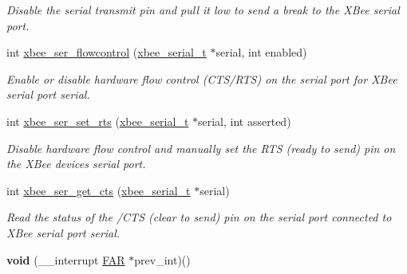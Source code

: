 \begin{DoxyCompactItemize}
\begin{DoxyCompactList}\small\item\em Disable the serial transmit pin and pull it low to send a break to the X\+Bee serial port. \end{DoxyCompactList}\item 
int \hyperlink{group__hal__dos_ga1f5f72ffdfbfb45ac523640db32296ff}{xbee\+\_\+ser\+\_\+flowcontrol} (\hyperlink{structxbee__serial__t}{xbee\+\_\+serial\+\_\+t} $\ast$serial, int enabled)
\begin{DoxyCompactList}\small\item\em Enable or disable hardware flow control (C\+T\+S/\+R\+TS) on the serial port for X\+Bee serial port {\itshape serial}. \end{DoxyCompactList}\item 
int \hyperlink{group__hal__dos_ga731188d8cf41d3d749bc84d51b672535}{xbee\+\_\+ser\+\_\+set\+\_\+rts} (\hyperlink{structxbee__serial__t}{xbee\+\_\+serial\+\_\+t} $\ast$serial, int asserted)
\begin{DoxyCompactList}\small\item\em Disable hardware flow control and manually set the R\+TS (ready to send) pin on the X\+Bee device\textquotesingle{}s serial port. \end{DoxyCompactList}\item 
int \hyperlink{group__hal__dos_ga894f6fadc890b5ba5ce32338f0acd217}{xbee\+\_\+ser\+\_\+get\+\_\+cts} (\hyperlink{structxbee__serial__t}{xbee\+\_\+serial\+\_\+t} $\ast$serial)
\begin{DoxyCompactList}\small\item\em Read the status of the /\+C\+TS (clear to send) pin on the serial port connected to X\+Bee serial port {\itshape serial}. \end{DoxyCompactList}\item 
\mbox{\label{group__hal__dos_ga475b2e273ce4aad9558201d41b6f4459}} 
{\bfseries void} (\+\_\+\+\_\+interrupt \hyperlink{group__hal_gaef060b3456fdcc093a7210a762d5f2ed}{F\+AR} $\ast$prev\+\_\+int)()
\end{DoxyCompactItemize}

